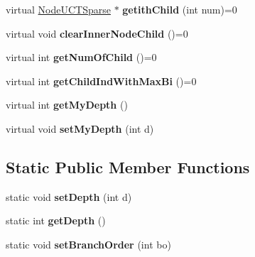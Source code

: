 \begin{DoxyCompactItemize}
\item 
\hypertarget{classMultiBoost_1_1NodeUCTSparse_a54dc4ac2dd9693cd3e5d3612dfeb2768}{virtual \hyperlink{classMultiBoost_1_1NodeUCTSparse}{Node\-U\-C\-T\-Sparse} $\ast$ {\bfseries getith\-Child} (int num)=0}\label{classMultiBoost_1_1NodeUCTSparse_a54dc4ac2dd9693cd3e5d3612dfeb2768}

\item 
\hypertarget{classMultiBoost_1_1NodeUCTSparse_aad6d27c2bcf2e173f60e342af77e9d34}{virtual void {\bfseries clear\-Inner\-Node\-Child} ()=0}\label{classMultiBoost_1_1NodeUCTSparse_aad6d27c2bcf2e173f60e342af77e9d34}

\item 
\hypertarget{classMultiBoost_1_1NodeUCTSparse_a224e3dffdfee2ceab08dfc257f40fe72}{virtual int {\bfseries get\-Num\-Of\-Child} ()=0}\label{classMultiBoost_1_1NodeUCTSparse_a224e3dffdfee2ceab08dfc257f40fe72}

\item 
\hypertarget{classMultiBoost_1_1NodeUCTSparse_a34ded869493de12e8d07b9e52c811ebc}{virtual int {\bfseries get\-Child\-Ind\-With\-Max\-Bi} ()=0}\label{classMultiBoost_1_1NodeUCTSparse_a34ded869493de12e8d07b9e52c811ebc}

\item 
\hypertarget{classMultiBoost_1_1NodeUCTSparse_a949058a4e4e112c9839da4f6035653ef}{virtual int {\bfseries get\-My\-Depth} ()}\label{classMultiBoost_1_1NodeUCTSparse_a949058a4e4e112c9839da4f6035653ef}

\item 
\hypertarget{classMultiBoost_1_1NodeUCTSparse_a171ce34b82f4f9c5bffac342c855cf43}{virtual void {\bfseries set\-My\-Depth} (int d)}\label{classMultiBoost_1_1NodeUCTSparse_a171ce34b82f4f9c5bffac342c855cf43}

\end{DoxyCompactItemize}
\subsection*{Static Public Member Functions}
\begin{DoxyCompactItemize}
\item 
\hypertarget{classMultiBoost_1_1NodeUCTSparse_a6e040f818807501ae8bc551e0197bd93}{static void {\bfseries set\-Depth} (int d)}\label{classMultiBoost_1_1NodeUCTSparse_a6e040f818807501ae8bc551e0197bd93}

\item 
\hypertarget{classMultiBoost_1_1NodeUCTSparse_a4d866c7cb583fe6d6090daeec9bed3cf}{static int {\bfseries get\-Depth} ()}\label{classMultiBoost_1_1NodeUCTSparse_a4d866c7cb583fe6d6090daeec9bed3cf}

\item 
\hypertarget{classMultiBoost_1_1NodeUCTSparse_a500e590f3688668e01f001481c6f77ed}{static void {\bfseries set\-Branch\-Order} (int bo)}\label{classMultiBoost_1_1NodeUCTSparse_a500e590f3688668e01f001481c6f77ed}

\end{DoxyCompactItemize}

